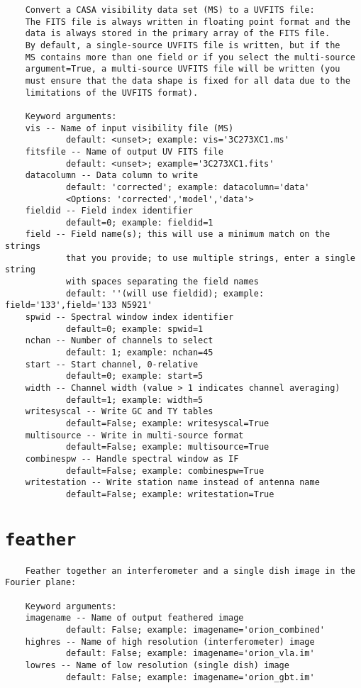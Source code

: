 \small
\begin{verbatim}
    Convert a CASA visibility data set (MS) to a UVFITS file:
    The FITS file is always written in floating point format and the
    data is always stored in the primary array of the FITS file.
    By default, a single-source UVFITS file is written, but if the
    MS contains more than one field or if you select the multi-source
    argument=True, a multi-source UVFITS file will be written (you
    must ensure that the data shape is fixed for all data due to the
    limitations of the UVFITS format).
    
    Keyword arguments:
    vis -- Name of input visibility file (MS)
            default: <unset>; example: vis='3C273XC1.ms'
    fitsfile -- Name of output UV FITS file
            default: <unset>; example='3C273XC1.fits'
    datacolumn -- Data column to write
            default: 'corrected'; example: datacolumn='data'
            <Options: 'corrected','model','data'>
    fieldid -- Field index identifier
            default=0; example: fieldid=1
    field -- Field name(s); this will use a minimum match on the strings
            that you provide; to use multiple strings, enter a single string
            with spaces separating the field names
            default: ''(will use fieldid); example: field='133',field='133 N5921'
    spwid -- Spectral window index identifier
            default=0; example: spwid=1
    nchan -- Number of channels to select
            default: 1; example: nchan=45
    start -- Start channel, 0-relative
            default=0; example: start=5
    width -- Channel width (value > 1 indicates channel averaging)
            default=1; example: width=5
    writesyscal -- Write GC and TY tables
            default=False; example: writesyscal=True
    multisource -- Write in multi-source format
            default=False; example: multisource=True
    combinespw -- Handle spectral window as IF
            default=False; example: combinespw=True
    writestation -- Write station name instead of antenna name
            default=False; example: writestation=True
\end{verbatim}
\normalsize


\section{{\tt feather}}
\label{section:tasks.feather}

\small
\begin{verbatim}
    Feather together an interferometer and a single dish image in the Fourier plane: 
    
    Keyword arguments:
    imagename -- Name of output feathered image
            default: False; example: imagename='orion_combined'
    highres -- Name of high resolution (interferometer) image
            default: False; example: imagename='orion_vla.im'
    lowres -- Name of low resolution (single dish) image
            default: False; example: imagename='orion_gbt.im'

\end{verbatim}
\normalsize



